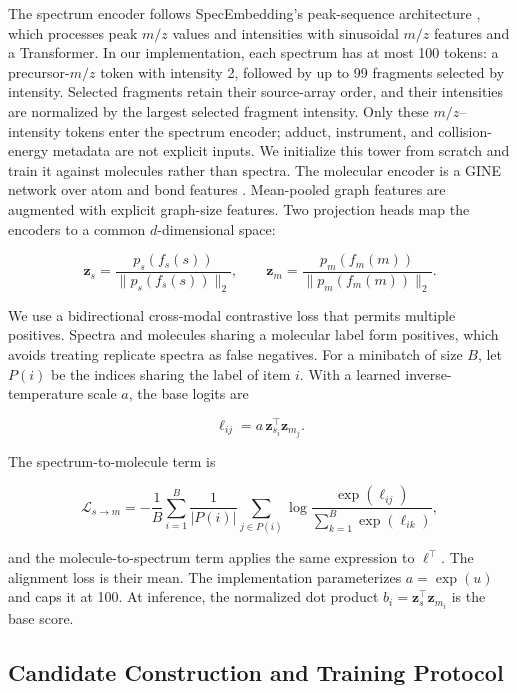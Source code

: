 \documentclass[runningheads]{llncs}
\newcommand{\zs}{\mathbf{z}_s}
\newcommand{\zm}{\mathbf{z}_m}
\begin{document}
The spectrum encoder follows SpecEmbedding's peak-sequence architecture
\cite{xiong2025specembedding}, which processes peak $m/z$ values and
intensities with sinusoidal $m/z$ features and a Transformer. In our
implementation, each spectrum has at most 100 tokens: a precursor-$m/z$ token
with intensity 2, followed by up to 99 fragments selected by intensity.
Selected fragments retain their source-array order, and their intensities are
normalized by the largest selected fragment intensity. Only these
$m/z$--intensity tokens enter the spectrum encoder; adduct, instrument, and
collision-energy metadata are not explicit inputs. We initialize this tower
from scratch and train it against molecules rather than spectra. The molecular
encoder is a GINE network over atom and bond features
\cite{hu2020pretraininggnn}. Mean-pooled graph features are augmented with
explicit graph-size features. Two projection heads map the encoders to a common
$d$-dimensional space:

\begin{equation}
  \zs = \frac{p_s(f_s(s))}{\lVert p_s(f_s(s))\rVert_2},
  \qquad
  \zm = \frac{p_m(f_m(m))}{\lVert p_m(f_m(m))\rVert_2}.
\end{equation}

We use a bidirectional cross-modal contrastive loss that permits multiple
positives. Spectra and molecules sharing a molecular label form positives,
which avoids treating replicate spectra as false negatives. For a minibatch of
size $B$, let $P(i)$ be the indices sharing the label of item $i$. With a
learned inverse-temperature scale $a$, the base logits are

\begin{equation}
  \ell_{ij}=a\,\mathbf{z}_{s_i}^{\top}\mathbf{z}_{m_j}.
\end{equation}

The spectrum-to-molecule term is

\begin{equation}
  \mathcal{L}_{s\rightarrow m}
  =-\frac{1}{B}\sum_{i=1}^{B}\frac{1}{|P(i)|}
  \sum_{j\in P(i)}
  \log\frac{\exp(\ell_{ij})}{\sum_{k=1}^{B}\exp(\ell_{ik})},
\end{equation}

and the molecule-to-spectrum term applies the same expression to
$\ell^\top$. The alignment loss is their mean. The implementation parameterizes
$a=\exp(u)$ and caps it at 100. At inference, the normalized dot product
$b_i=\zs^\top\mathbf{z}_{m_i}$ is the base score.

\subsection{Candidate Construction and Training Protocol}
\end{document}
